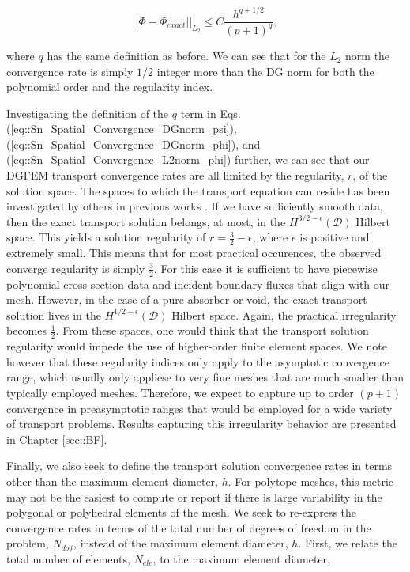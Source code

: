 \begin{equation}
\label{eq::Sn_Spatial_Convergence_L2norm_phi}
|| \Phi - \Phi_{exact} ||_{L_2} \leq C \frac{h^{q+1/2}}{(p+1)^q},
\end{equation}

\noindent where $q$ has the same definition as before. We can see that for the $L_2$ norm the convergence rate is simply $1/2$ integer more than the DG norm for both the polynomial order and the regularity index.

Investigating the definition of the $q$ term in Eqs. (\ref{eq::Sn_Spatial_Convergence_DGnorm_psi}), (\ref{eq::Sn_Spatial_Convergence_DGnorm_phi}), and (\ref{eq::Sn_Spatial_Convergence_L2norm_phi}) further, we can see that our DGFEM transport convergence rates are all limited by the regularity, $r$, of the solution space. The spaces to which the transport equation can reside has been investigated by others in previous works \cite{wang2009convergence,magenes1970problemes,johnson1983convergence}. If we have sufficiently smooth data, then the exact transport solution belongs, at most, in the $H^{3/2-\epsilon} (\mathcal{D})$ Hilbert space. This yields a solution regularity of $r=\frac{3}{2}-\epsilon$, where $\epsilon$ is positive and extremely small. This means that for most practical occurences, the observed converge regularity is simply $\frac{3}{2}$. For this case it is sufficient to have piecewise polynomial cross section data and incident boundary fluxes that align with our mesh. However, in the case of a pure absorber or void, the exact transport solution lives in the $H^{1/2-\epsilon} (\mathcal{D})$ Hilbert space. Again, the practical irregularity becomes $\frac{1}{2}$. From these spaces, one would think that the transport solution regularity would impede the use of higher-order finite element spaces. We note however that these regularity indices only apply to the asymptotic convergence range, which usually only appliese to very fine meshes that are much smaller than typically employed meshes. Therefore, we expect to capture up to order $(p+1)$ convergence in preasymptotic ranges that would be employed for a wide variety of transport problems. Results capturing this irregularity behavior are presented in Chapter \ref{sec::BF}.

Finally, we also seek to define the transport solution convergence rates in terms other than the maximum element diameter, $h$. For polytope meshes, this metric may not be the easiest to compute or report if there is large variability in the polygonal or polyhedral elements of the mesh. We seek to re-express the convergence rates in terms of the total number of degrees of freedom in the problem, $N_{dof}$, instead of the maximum element diameter, $h$. First, we relate the total number of elements, $N_{ele}$, to the maximum element diameter,

